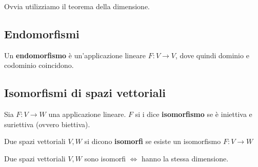 \documentclass[
  a4paper,
]{article}
\begin{document}
\begin{proofbox}
Ovvia utilizziamo il teorema della dimensione.
\end{proofbox}

\hypertarget{endomorfismi}{%
\subsection{Endomorfismi}\label{endomorfismi}}

\begin{definitionbox}
Un \textbf{endomorfismo} è un'applicazione lineare \(F: V \to V\), dove
quindi dominio e codominio coincidono.
\end{definitionbox}

\hypertarget{isomorfismi-di-spazi-vettoriali}{%
\subsection{Isomorfismi di spazi
vettoriali}\label{isomorfismi-di-spazi-vettoriali}}

\begin{definitionbox}
Sia \(F : V \to W\) una applicazione lineare. \(F\) si i dice
\textbf{isomorfismo} se è iniettiva e suriettiva (ovvero biettiva).
\end{definitionbox}

\begin{definitionbox}
Due spazi vettoriali \(V, W\) si dicono \textbf{isomorfi} se esiste un
isomorfismo \(F: V \to W\)
\end{definitionbox}

\begin{teoremabox}
Due spazi vettoriali \(V, W\) sono isomorfi \(\iff\) hanno la stessa
dimensione.
\end{teoremabox}
\end{document}
